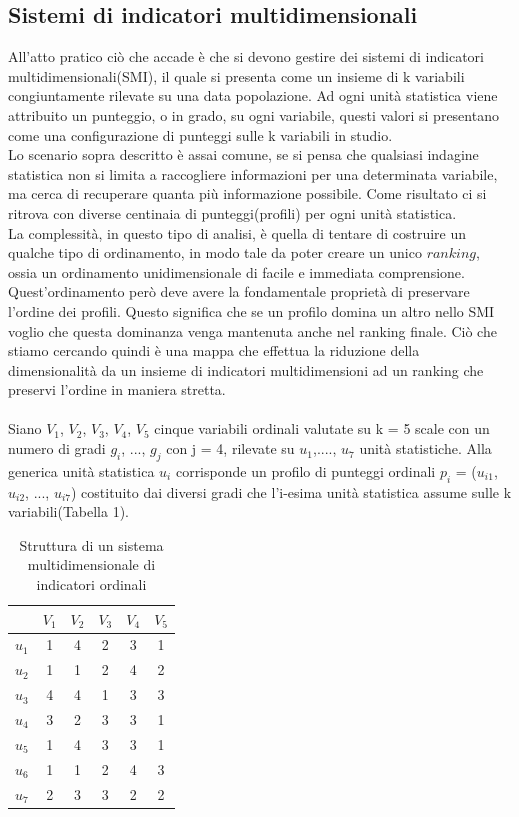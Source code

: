 \documentclass[12pt]{article}
\begin{document}
\subsection{Sistemi di indicatori multidimensionali}

All'atto pratico ciò che accade è che si devono gestire dei sistemi di indicatori multidimensionali(SMI), il quale si presenta come un insieme di k variabili 
congiuntamente rilevate su una data popolazione. Ad ogni unità statistica viene attribuito un punteggio, o in grado, su ogni 
variabile, questi valori si presentano come una configurazione di punteggi sulle k variabili in studio. \\
Lo scenario sopra descritto è assai comune, se si pensa che qualsiasi indagine statistica non si limita a raccogliere informazioni per una 
determinata variabile, ma cerca di recuperare quanta più informazione possibile. Come risultato ci si ritrova con diverse centinaia di 
punteggi(profili) per ogni unità statistica. \\
La complessità, in questo tipo di analisi, è quella di tentare di costruire un qualche tipo di ordinamento, in modo tale da poter creare un unico  $\textit{ranking}$, 
ossia un ordinamento unidimensionale di facile e immediata comprensione. Quest'ordinamento però deve avere la fondamentale proprietà di 
preservare l'ordine dei profili. Questo significa che se un profilo domina un altro nello SMI voglio che questa dominanza venga
mantenuta anche nel ranking finale. Ciò che stiamo cercando quindi è una mappa che effettua la riduzione della dimensionalità da un insieme di 
indicatori multidimensioni ad un ranking che preservi l'ordine in maniera stretta. \\
\\
Siano $V_{1}$, $V_{2}$, $V_{3}$, $V_{4}$, $V_{5}$ cinque variabili ordinali valutate su k = 5 scale con un numero di gradi $g_{i}$, ..., $g_{j}$ con j = 4, 
rilevate su $u_{1}$,...., $u_{7}$ unità statistiche. Alla generica unità statistica $u_{i}$ corrisponde un profilo di punteggi ordinali 
$p_{i}$ = ($u_{i1}$, $u_{i2}$, ..., $u_{i7}$) costituito dai diversi gradi che l'i-esima unità statistica assume sulle k variabili(Tabella 1). \\
\begin{table}[h!]
    \centering
    \begin{tabular}{||c c c c c c||} 
     \hline
           & $V_{1}$ & $V_{2}$ & $V_{3}$ & $V_{4}$ & $V_{5}$ \\ [0.5ex] 
     \hline\hline
     $u_{1}$ & 1 & 4 & 2 & 3 & 1 \\ 
     $u_{2}$ & 1 & 1 & 2 & 4 & 2 \\
     $u_{3}$ & 4 & 4 & 1 & 3 & 3  \\
     $u_{4}$ & 3 & 2 & 3 & 3 & 1  \\
     $u_{5}$ & 1 & 4 & 3 & 3 & 1  \\ 
     $u_{6}$ & 1 & 1 & 2 & 4 & 3 \\
     $u_{7}$ & 2 & 3 & 3 & 2 & 2 \\ [1ex] 
     \hline
    \end{tabular}
    \caption{Struttura di un sistema multidimensionale di indicatori ordinali}
    \label{table:1}
\end{table}
\end{document}
